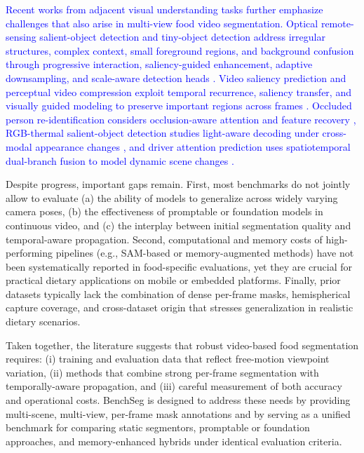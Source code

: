 \documentclass[preprint,12pt]{elsarticle}
\newcommand{\change}[1]{\textcolor{blue}{#1}}
\newcommand{\pr}[1]{\textcolor{red}{#1}}
\begin{document}
\change{Recent works from adjacent visual understanding tasks further emphasize challenges that also arise in multi-view food video segmentation. Optical remote-sensing salient-object detection and tiny-object detection address irregular structures, complex context, small foreground regions, and background confusion through progressive interaction, saliency-guided enhancement, adaptive downsampling, and scale-aware detection heads \cite{zhang2026orsi,zhang2025adaptive}. Video saliency prediction and perceptual video compression exploit temporal recurrence, saliency transfer, and visually guided modeling to preserve important regions across frames \cite{zhang2025videosaliency,zhang2025perceptual}. Occluded person re-identification considers occlusion-aware attention and feature recovery \cite{zhang2025cross}, RGB-thermal salient-object detection studies light-aware decoding under cross-modal appearance changes \cite{zhang2025asymmetric}, and driver attention prediction uses spatiotemporal dual-branch fusion to model dynamic scene changes \cite{zhang2025driver}.}


Despite progress, important gaps remain. First, most benchmarks do not jointly allow to evaluate (a) the ability of models to generalize across widely varying camera poses, (b) the effectiveness of promptable or foundation models in continuous video, and (c) the interplay between initial segmentation quality and temporal-aware propagation. Second, computational and memory costs of high-performing pipelines (e.g., SAM-based or memory-augmented methods) have not been systematically reported in food-specific evaluations, yet they are crucial for practical dietary applications on mobile or embedded platforms. Finally, prior datasets typically lack the combination of dense per-frame masks, hemispherical capture coverage, and cross-dataset origin that stresses generalization in realistic dietary scenarios.

Taken together, the literature suggests that robust video-based food segmentation requires: (i) training and evaluation data that reflect free-motion viewpoint variation, (ii) methods that combine strong per-frame segmentation with temporally-aware propagation, and (iii) careful measurement of both accuracy and operational costs. BenchSeg is designed to address these needs by providing multi-scene, multi-view, per-frame mask annotations and by serving as a unified benchmark for comparing static segmentors, promptable or foundation approaches, and memory-enhanced hybrids under identical evaluation criteria.
\end{document}
